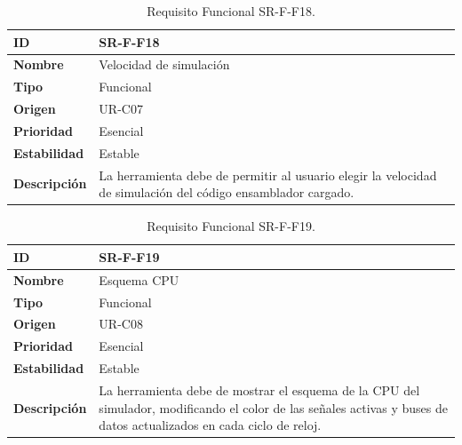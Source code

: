 \begin{center}
\begin{table}[htbp]
\centering
\begin{tabular}{@{}p{2.5cm} p{9cm}@{}} 
\toprule
\textbf{ID} 				& SR-F-F18 \\
\midrule
\textbf{Nombre} 			& Velocidad de simulación\\
\midrule
\textbf{Tipo} 			& Funcional \\
\midrule
\textbf{Origen} 			& UR-C07 \\
\midrule
\textbf{Prioridad}		& Esencial \\
\midrule
\textbf{Estabilidad} 		& Estable \\
\midrule
\textbf{Descripción} 	& La herramienta debe de permitir al usuario elegir la velocidad de simulación del código ensamblador cargado. \\
\bottomrule
\end{tabular}
\caption{Requisito Funcional SR-F-F18.}
\label{tab:srff18}
\end{table}
\end{center}

\begin{center}
\begin{table}[htbp]
\centering
\begin{tabular}{@{}p{2.5cm} p{9cm}@{}} 
\toprule
\textbf{ID} 				& SR-F-F19 \\
\midrule
\textbf{Nombre} 			& Esquema CPU\\
\midrule
\textbf{Tipo} 			& Funcional \\
\midrule
\textbf{Origen} 			& UR-C08 \\
\midrule
\textbf{Prioridad}		& Esencial \\
\midrule
\textbf{Estabilidad} 		& Estable \\
\midrule
\textbf{Descripción} 	& La herramienta debe de mostrar el esquema de la CPU del simulador, modificando el color de las señales activas y buses de datos actualizados en cada ciclo de reloj. \\
\bottomrule
\end{tabular}
\caption{Requisito Funcional SR-F-F19.}
\label{tab:srff19}
\end{table}
\end{center}

